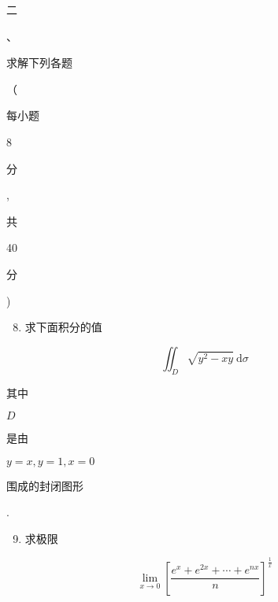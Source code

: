 \documentclass[10pt]{article}
\begin{document}
\begin{CJK}{UTF8}{mj}二\end{CJK}、\begin{CJK}{UTF8}{mj}求解下列各题\end{CJK}（\begin{CJK}{UTF8}{mj}每小题\end{CJK} 8 \begin{CJK}{UTF8}{mj}分\end{CJK}, \begin{CJK}{UTF8}{mj}共\end{CJK} 40 \begin{CJK}{UTF8}{mj}分\end{CJK})

\begin{enumerate}
  \setcounter{enumi}{7}
  \item \begin{CJK}{UTF8}{mj}求下面积分的值\end{CJK}
\end{enumerate}
$$
\iint_{D} \sqrt{y^{2}-x y} \mathrm{~d} \sigma
$$
\begin{CJK}{UTF8}{mj}其中\end{CJK} $D$ \begin{CJK}{UTF8}{mj}是由\end{CJK} $y=x, y=1, x=0$ \begin{CJK}{UTF8}{mj}围成的封闭图形\end{CJK}.

\begin{enumerate}
  \setcounter{enumi}{8}
  \item \begin{CJK}{UTF8}{mj}求极限\end{CJK}
\end{enumerate}
$$
\lim _{x \rightarrow 0}\left[\frac{e^{x}+e^{2 x}+\cdots+e^{n x}}{n}\right]^{\frac{1}{x}}
$$
\end{document}
